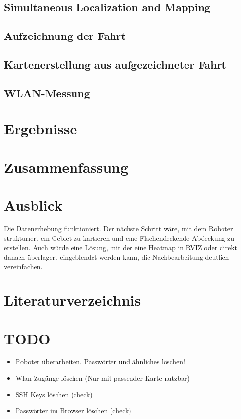 \documentclass{scrartcl}%
\begin{document}
\subsection{Simultaneous Localization and Mapping}

\subsection{Aufzeichnung der Fahrt}

\subsection{Kartenerstellung aus aufgezeichneter Fahrt}

\subsection{WLAN-Messung}

\section{Ergebnisse}

\section{Zusammenfassung}


\section{Ausblick}
Die Datenerhebung funktioniert. Der nächste Schritt wäre, mit dem Roboter strukturiert ein Gebiet zu kartieren und eine Flächendeckende Abdeckung zu erstellen. Auch würde eine Lösung, mit der eine Heatmap in RVIZ oder direkt danach überlagert eingeblendet werden kann, die Nachbearbeitung deutlich vereinfachen.



\section{Literaturverzeichnis}







\section{TODO}
\begin{itemize}
	\item Roboter überarbeiten, Passwörter und ähnliches löschen!
	\item Wlan Zugänge löschen (Nur mit passender Karte nutzbar)
	\item SSH Keys löschen (check)
	\item Passwörter im Browser löschen (check)
\end{itemize}
\end{document}
